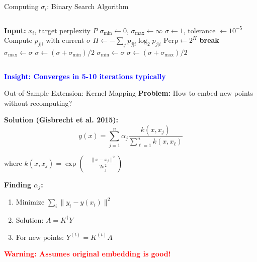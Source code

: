 \documentclass[aspectratio=169]{beamer}
\newcommand{\conceptbox}[2]{\colorbox{#1!20}{\textcolor{#1}{\textbf{#2}}}}
\newcommand{\warning}[1]{\conceptbox{red}{Warning: #1}}
\newcommand{\insight}[1]{\conceptbox{blue}{Insight: #1}}
\begin{document}
\begin{frame}{Computing $\sigma_i$: Binary Search Algorithm}
\begin{columns}
    \begin{algorithmic}[1]
        \State \textbf{Input:} $x_i$, target perplexity $P$
        \State $\sigma_{\min} \leftarrow 0$, $\sigma_{\max} \leftarrow \infty$
        \State $\sigma \leftarrow 1$, tolerance $\leftarrow 10^{-5}$
            \State Compute $p_{j|i}$ with current $\sigma$
            \State $H \leftarrow -\sum_j p_{j|i} \log_2 p_{j|i}$
            \State $\text{Perp} \leftarrow 2^H$
                \State \textbf{break}
                \State $\sigma_{\max} \leftarrow \sigma$
                \State $\sigma \leftarrow (\sigma + \sigma_{\min})/2$
            \Else
                \State $\sigma_{\min} \leftarrow \sigma$
                \State $\sigma \leftarrow (\sigma + \sigma_{\max})/2$
            \EndIf
        \EndWhile
    \end{algorithmic}

    \begin{center}
    \end{center}
\end{columns}

\insight{Converges in 5-10 iterations typically}
\end{frame}

\begin{frame}{Out-of-Sample Extension: Kernel Mapping}
\textbf{Problem:} How to embed new points without recomputing?

\textbf{Solution (Gisbrecht et al. 2015):}
$$y(x) = \sum_{j=1}^n \alpha_j \frac{k(x, x_j)}{\sum_{\ell=1}^n k(x, x_\ell)}$$

where $k(x, x_j) = \exp\left(-\frac{\|x - x_j\|^2}{2\sigma_j^2}\right)$

\textbf{Finding $\alpha_j$:}
\begin{enumerate}
\item Minimize $\sum_i \|y_i - y(x_i)\|^2$
\item Solution: $A = K^{\dagger}Y$
\item For new points: $Y^{(t)} = K^{(t)}A$
\end{enumerate}

\warning{Assumes original embedding is good!}
\end{frame}
\end{document}
